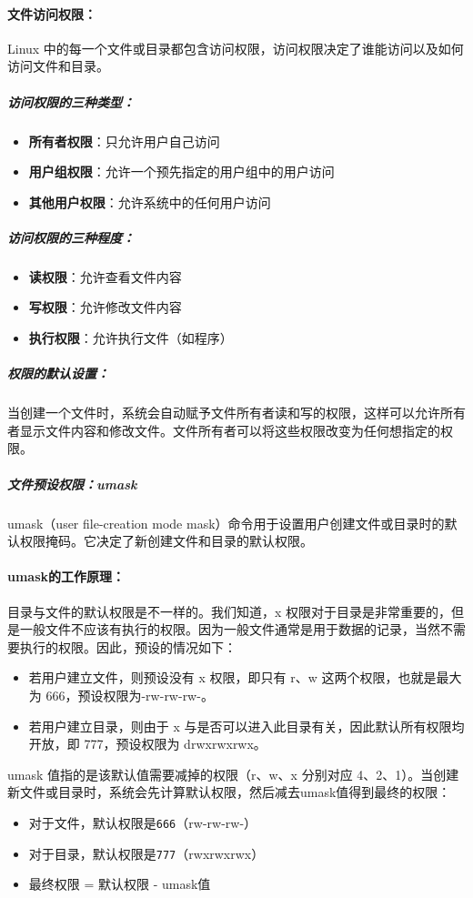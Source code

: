 \documentclass[12pt,UTF8]{ctexbook}
\begin{document}
\paragraph{文件访问权限：}
Linux 中的每一个文件或目录都包含访问权限，访问权限决定了谁能访问以及如何访问文件和目录。

\subparagraph{访问权限的三种类型：}
\begin{itemize}
    \item \textbf{所有者权限}：只允许用户自己访问
    \item \textbf{用户组权限}：允许一个预先指定的用户组中的用户访问
    \item \textbf{其他用户权限}：允许系统中的任何用户访问
\end{itemize}

\subparagraph{访问权限的三种程度：}
\begin{itemize}
    \item \textbf{读权限}：允许查看文件内容
    \item \textbf{写权限}：允许修改文件内容
    \item \textbf{执行权限}：允许执行文件（如程序）
\end{itemize}

\subparagraph{权限的默认设置：}
当创建一个文件时，系统会自动赋予文件所有者读和写的权限，这样可以允许所有者显示文件内容和修改文件。文件所有者可以将这些权限改变为任何想指定的权限。

\subparagraph{文件预设权限：umask}
umask（user file-creation mode mask）命令用于设置用户创建文件或目录时的默认权限掩码。它决定了新创建文件和目录的默认权限。

\paragraph{umask的工作原理：}
目录与文件的默认权限是不一样的。我们知道，x 权限对于目录是非常重要的，但是一般文件不应该有执行的权限。因为一般文件通常是用于数据的记录，当然不需要执行的权限。因此，预设的情况如下：

\begin{itemize}
    \item 若用户建立文件，则预设没有 x 权限，即只有 r、w 这两个权限，也就是最大为 666，预设权限为-rw-rw-rw-。
    \item 若用户建立目录，则由于 x 与是否可以进入此目录有关，因此默认所有权限均开放，即 777，预设权限为 drwxrwxrwx。
\end{itemize}

umask 值指的是该默认值需要减掉的权限（r、w、x 分别对应 4、2、1）。当创建新文件或目录时，系统会先计算默认权限，然后减去umask值得到最终的权限：
\begin{itemize}
    \item 对于文件，默认权限是\verb+666+（rw-rw-rw-）
    \item 对于目录，默认权限是\verb+777+（rwxrwxrwx）
    \item 最终权限 = 默认权限 - umask值
\end{itemize}
\end{document}
